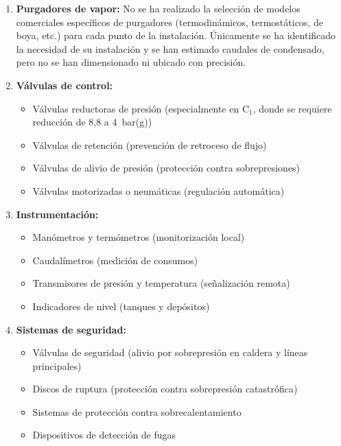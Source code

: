 \begin{enumerate}[label=\arabic*., leftmargin=2em]
	\item \textbf{Purgadores de vapor:} No se ha realizado la selección de modelos comerciales específicos de purgadores (termodinámicos, termostáticos, de boya, etc.) para cada punto de la instalación. Únicamente se ha identificado la necesidad de su instalación y se han estimado caudales de condensado, pero no se han dimensionado ni ubicado con precisión.

	\item \textbf{Válvulas de control:}
	      \begin{itemize}[noitemsep]
		      \item Válvulas reductoras de presión (especialmente en C$_1$, donde se requiere reducción de 8,8 a 4~bar(g))
		      \item Válvulas de retención (prevención de retroceso de flujo)
		      \item Válvulas de alivio de presión (protección contra sobrepresiones)
		      \item Válvulas motorizadas o neumáticas (regulación automática)
	      \end{itemize}

	\item \textbf{Instrumentación:}
	      \begin{itemize}[noitemsep]
		      \item Manómetros y termómetros (monitorización local)
		      \item Caudalímetros (medición de consumos)
		      \item Transmisores de presión y temperatura (señalización remota)
		      \item Indicadores de nivel (tanques y depósitos)
	      \end{itemize}

	\item \textbf{Sistemas de seguridad:}
	      \begin{itemize}[noitemsep]
		      \item Válvulas de seguridad (alivio por sobrepresión en caldera y líneas principales)
		      \item Discos de ruptura (protección contra sobrepresión catastrófica)
		      \item Sistemas de protección contra sobrecalentamiento
		      \item Dispositivos de detección de fugas
	      \end{itemize}
\end{enumerate}

